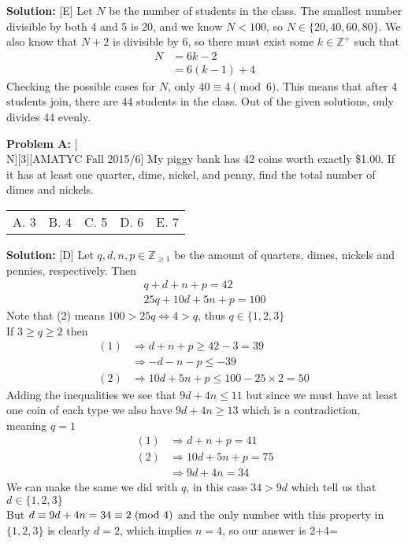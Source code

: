 \documentclass[12pt]{article}
\makeatletter
\newcounter{problem}
\newenvironment{problem}[1]{%
    \stepcounter{problem}
    \noindent\textbf{Problem A\theproblem:} #1
    \\[1em]
}{}
\newcommand{\multChoice}[5]{%
    \begin{tabular}{l @{\hskip 1.5cm} l @{\hskip 1.5cm} l @{\hskip 1.5cm} l @{\hskip 1.5cm} l}
    A. #1 & B. #2 & C. #3 & D. #4 & E. #5
    \end{tabular}
}
\newenvironment{solution}{%
    \vspace{1em}
    \noindent\textbf{Solution:} 
}{}
\makeatother
\begin{document}
\begin{solution}[E]
    Let $N$ be the number of students in the class. The smallest number divisible by both 4 and 5 is 20, and we know $N<100$, so $N \in \{20, 40 , 60 , 80\}$. We also know that $N+2$ is divisible by 6, so there must exist some $k \in \mathbb{Z}^+$ such that
    \begin{align*}
        N &= 6k-2\\
        &=6(k-1)+4
    \end{align*}
    Checking the possible cases for $N$, only $40 \equiv 4 \pmod6$. This means that after 4 students join, there are 44 students in the class. Out of the given solutions, only  divides 44 evenly.
\end{solution}

\vskip 1cm

\begin{problem}[N][3][AMATYC Fall 2015/6]
    My piggy bank has 42 coins worth exactly \$1.00. If it has at least one quarter, dime, nickel, and penny, find the total number of dimes and nickels.
   \end{problem}
\multChoice{3}{4}{5}{6}{7}

\begin{solution}[D]
   Let $q,d,n,p \in \mathbb{Z}_{\geq 1}$ be the amount of quarters, dimes, nickels and pennies, respectively. Then
\begin{align}
    q+d+n+p=42 \\
    25q+10d+5n+p=100
\end{align}
Note that (2) means $100>25q \iff 4>q$, thus $q \in \{1,2,3\}$ \\
If $3 \geq q \geq 2$ then 
\begin{align*}
    (1) &\Rightarrow d+n+p \geq 42-3 = 39\\ %
        &\Rightarrow -d-n-p \leq -39 \\
    (2) &\Rightarrow 10d+5n+p \leq 100 - 25 \times 2 = 50 \
\end{align*}
Adding the inequalities we see that $9d+4n \leq 11$ but since we must have at least one coin of each type we also have $9d+4n \geq 13$ which is a contradiction, meaning $q=1$
\begin{align*}
    (1) &\Rightarrow d+n+p = 41 \\  %
    (2) &\Rightarrow 10d+5n+p= 75 \\
        &\Rightarrow 9d+4n=34
\end{align*}
We can make the same we did with $q$, in this case $34>9d$ which tell us that $d \in \{1,2,3\}$ \\
But $d \equiv 9d+4n = 34 \equiv 2 \hspace{3pt} (\hspace{-7pt} \mod 4)$ and the only number with this property in $\{1,2,3\}$ is clearly $d=2$, which implies $n=4$, so our answer is 2+4=

\end{solution}
\end{document}
